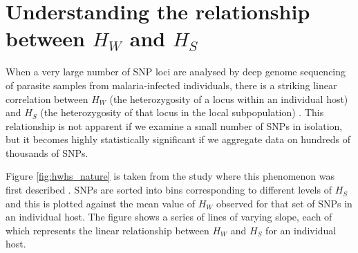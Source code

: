 \documentclass[_main.tex]{subfiles}
\begin{document}




\section*{Understanding the relationship between $H_W$ and $H_S$}
\label{main_section_Hw_Hs}  

When a very large number of SNP loci are analysed by deep genome sequencing of parasite samples from malaria-infected individuals, there is a striking linear correlation between $H_W$ (the heterozygosity of a locus within an individual host) and $H_S$ (the heterozygosity of that locus in the local subpopulation) \cite{Manske2012,Auburn2012}.   This relationship is not apparent if we examine a small number of SNPs in isolation, but it becomes highly statistically significant if we aggregate data on hundreds of thousands of SNPs.

Figure \ref{fig:hwhs_nature} is taken from the study where this phenomenon was first described \cite{Manske2012}.  SNPs are sorted into bins corresponding to different levels of $H_S$ and this is plotted against the mean value of $H_W$ observed for that set of SNPs in an individual host.   The figure shows a series of lines of varying slope, each of which represents the linear relationship between $H_W$ and $H_S$ for an individual host.
\end{document}
